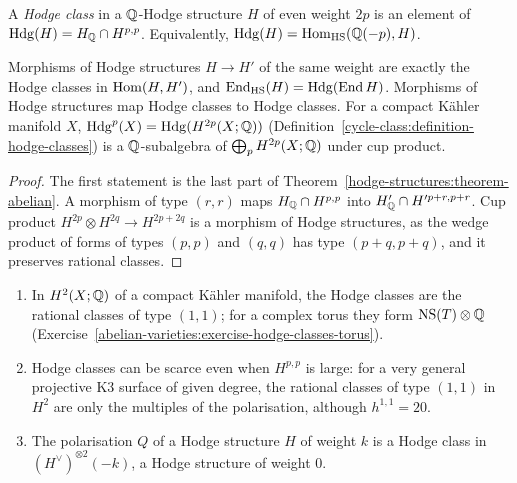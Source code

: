 \begin{definition}\label{hodge-structures:definition-hodge-classes}
A \emph{Hodge class} in a $\mathbb{Q}$-Hodge structure $H$ of even weight $2p$ is an element of $\mathrm{Hdg}(H) = H_{\mathbb{Q}} \cap H^{p,p}$. Equivalently, $\mathrm{Hdg}(H) = \operatorname{Hom}_{\mathrm{HS}}(\mathbb{Q}(-p), H)$.
\end{definition}

\begin{proposition}\label{hodge-structures:proposition-hodge-classes-morphisms}
Morphisms of Hodge structures $H \to H'$ of the same weight are exactly the Hodge classes in $\operatorname{Hom}(H, H')$, and $\mathrm{End}_{\mathrm{HS}}(H) = \mathrm{Hdg}(\operatorname{End} H)$. Morphisms of Hodge structures
map Hodge classes to Hodge classes. For a compact K\"ahler manifold $X$, $\mathrm{Hdg}^p(X) = \mathrm{Hdg}(H^{2p}(X; \mathbb{Q}))$ (Definition~\ref{cycle-class:definition-hodge-classes}) is a
$\mathbb{Q}$-subalgebra of $\bigoplus_pH^{2p}(X; \mathbb{Q})$ under cup product.
\end{proposition}

\begin{proof}
The first statement is the last part of Theorem~\ref{hodge-structures:theorem-abelian}. A morphism of type $(r,r)$ maps $H_{\mathbb{Q}} \cap H^{p,p}$ into $H'_{\mathbb{Q}} \cap H'^{p+r,p+r}$. Cup product
$H^{2p} \otimes H^{2q} \to H^{2p+2q}$ is a morphism of Hodge structures, as the wedge product of forms of types $(p,p)$ and $(q,q)$ has type $(p+q,p+q)$, and it preserves rational classes.
\end{proof}

\begin{example}\label{hodge-structures:example-hodge-classes}
\begin{enumerate}
\item In $H^2(X; \mathbb{Q})$ of a compact K\"ahler manifold, the Hodge classes are the rational classes of type $(1,1)$; for a complex torus they form $\mathrm{NS}(T) \otimes \mathbb{Q}$
(Exercise~\ref{abelian-varieties:exercise-hodge-classes-torus}).
\item Hodge classes can be scarce even when $H^{p,p}$ is large: for a very general projective K3 surface of given degree, the rational classes of type $(1,1)$ in $H^2$ are only the
multiples of the polarisation, although $h^{1,1} = 20$.
\item The polarisation $Q$ of a Hodge structure $H$ of weight $k$ is a Hodge class in $(H^\vee)^{\otimes 2}(-k)$, a Hodge structure of weight $0$.
\end{enumerate}
\end{example}

